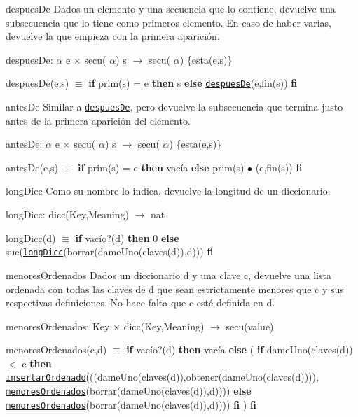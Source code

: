 \begin{DoxyParagraph}{despues\-De}
Dados un elemento y una secuencia que lo contiene, devuelve una subsecuencia que lo tiene como primeros elemento. En caso de haber varias, devuelve la que empieza con la primera aparición.

despues\-De\-:  $\alpha$ e $\times$ secu( $\alpha$) s $\to$ secu( $\alpha$) \{esta(e,s)\} \par
 despues\-De(e,s) $\equiv$ {\bfseries if} prim(s) = e {\bfseries then} s {\bfseries else} \href{axiomas.html#despuesDe}{\tt despues\-De}(e,fin(s)) {\bfseries fi} 


\end{DoxyParagraph}
\begin{DoxyParagraph}{antes\-De}
Similar a \href{axiomas.html#despuesDe}{\tt despues\-De}, pero devuelve la subsecuencia que termina justo antes de la primera aparición del elemento.

antes\-De\-:  $\alpha$ e $\times$ secu( $\alpha$) s $\to$ secu( $\alpha$) \{esta(e,s)\} \par
 antes\-De(e,s) $\equiv$ {\bfseries if} prim(s) = e {\bfseries then} vacía {\bfseries else} prim(s) $\bullet$ (e,fin(s)) {\bfseries fi} 


\end{DoxyParagraph}
\begin{DoxyParagraph}{long\-Dicc}
Como su nombre lo indica, devuelve la longitud de un diccionario.

long\-Dicc\-: dicc(\-Key,\-Meaning) $\to$ nat \par
 long\-Dicc(d) $\equiv$ {\bfseries if} vacío?(d) {\bfseries then} 0 {\bfseries else} suc(\href{axiomas.html#longDicc}{\tt long\-Dicc}(borrar(dame\-Uno(claves(d)),d))) {\bfseries fi} 


\end{DoxyParagraph}
\begin{DoxyParagraph}{menores\-Ordenados}
Dados un diccionario d y una clave c, devuelve una lista ordenada con todas las claves de d que sean estrictamente menores que c y sus respectivas definiciones. No hace falta que c esté definida en d.

menores\-Ordenados\-: Key $\times$ dicc(\-Key,\-Meaning) $\to$ secu(value) \par
 menores\-Ordenados(c,d) $\equiv$ {\bfseries if} vacío?(d) {\bfseries then} vacía {\bfseries else} ( {\bfseries if} dame\-Uno(claves(d)) $<$ c {\bfseries then} \href{axiomas.html#insertarOrdenado}{\tt insertar\-Ordenado}(((dame\-Uno(claves(d)),obtener(dame\-Uno(claves(d)))), \href{axiomas.html#menoresOrdenados}{\tt menores\-Ordenados}(borrar(dame\-Uno(claves(d)),d)))) {\bfseries else} \href{axiomas.html#menoresOrdenados}{\tt menores\-Ordenados}(borrar(dame\-Uno(claves(d)),d)))) {\bfseries fi} ) {\bfseries fi} 


\end{DoxyParagraph}
